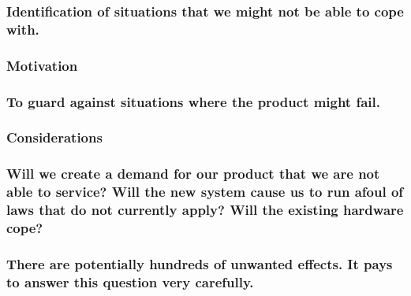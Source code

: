 \documentclass[
]{article}
\begin{document}
\hypertarget{identification-of-situations-that-we-might-not-be-able-to-cope-with.}{%
\subsubsection{Identification of situations that we might not be able to
cope
with.}\label{identification-of-situations-that-we-might-not-be-able-to-cope-with.}}

\hypertarget{motivation-67}{%
\subsubsection{Motivation}\label{motivation-67}}

\hypertarget{to-guard-against-situations-where-the-product-might-fail.}{%
\subsubsection{To guard against situations where the product might
fail.}\label{to-guard-against-situations-where-the-product-might-fail.}}

\hypertarget{considerations-49}{%
\subsubsection{Considerations}\label{considerations-49}}

\hypertarget{will-we-create-a-demand-for-our-product-that-we-are-not-able-to-service-will-the-new-system-cause-us-to-run-afoul-of-laws-that-do-not-currently-apply-will-the-existing-hardware-cope}{%
\subsubsection{Will we create a demand for our product that we are not
able to service? Will the new system cause us to run afoul of laws that
do not currently apply? Will the existing hardware
cope?}\label{will-we-create-a-demand-for-our-product-that-we-are-not-able-to-service-will-the-new-system-cause-us-to-run-afoul-of-laws-that-do-not-currently-apply-will-the-existing-hardware-cope}}

\hypertarget{there-are-potentially-hundreds-of-unwanted-effects.-it-pays-to-answer-this-question-very-carefully.}{%
\subsubsection{There are potentially hundreds of unwanted effects. It
pays to answer this question very
carefully.}\label{there-are-potentially-hundreds-of-unwanted-effects.-it-pays-to-answer-this-question-very-carefully.}}
\end{document}
